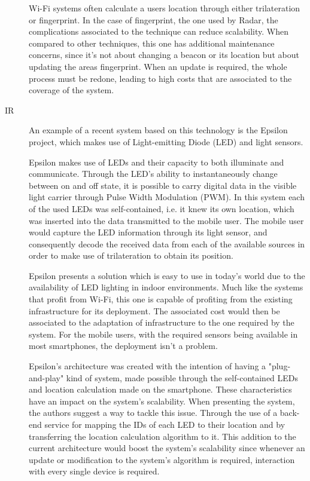 \begin{description}
 
Wi-Fi systems often calculate a users location through either trilateration or fingerprint. In the case of fingerprint, the one used by Radar, the complications associated to the technique can reduce scalability. When compared to other techniques, this one has additional maintenance concerns, since it's not about changing a beacon or its location but about updating the areas fingerprint. When an update is required, the whole process must be redone, leading to high costs that are associated to the coverage of the system. 
  
 
 
\item[\acf{IR}] An example of a recent system based on this technology is the Epsilon project\cite{epsilon}, which makes use of Light-emitting Diode (LED) and light sensors.   
 
 
Epsilon makes use of LEDs and their capacity to both illuminate and communicate. Through the LED's ability to instantaneously change between on and off state, it is possible to carry digital data in the visible light carrier through Pulse Width Modulation (PWM). In this system each of the used LEDs was self-contained, i.e. it knew its own location, which was inserted into the data transmitted to the mobile user. The mobile user would capture the LED information through its light sensor, and consequently decode the received data from each of the available sources in order to make use of trilateration to obtain its position. 
 
 
Epsilon presents a solution which is easy to use in today's world due to the availability of LED lighting in indoor environments. Much like the systems that profit from Wi-Fi, this one is capable of profiting from the existing infrastructure for its deployment. The associated cost would then be associated to the adaptation of infrastructure to the one required by the system. For the mobile users, with the required sensors being available in most smartphones, the deployment isn't a problem. 
 
 
Epsilon's architecture was created with the intention of having a "plug-and-play" kind of system, made possible through the self-contained LEDs and location calculation made on the smartphone. These characteristics have an impact on the system's scalability. 
When presenting the system, the authors suggest a way to tackle this issue. Through the use of a back-end service for mapping the IDs of each LED to their location and by transferring the location calculation algorithm to it. This addition to the current architecture would boost the system's scalability since whenever an update or modification to the system's algorithm is required, interaction with every single device is required. 
 

\end{description}
